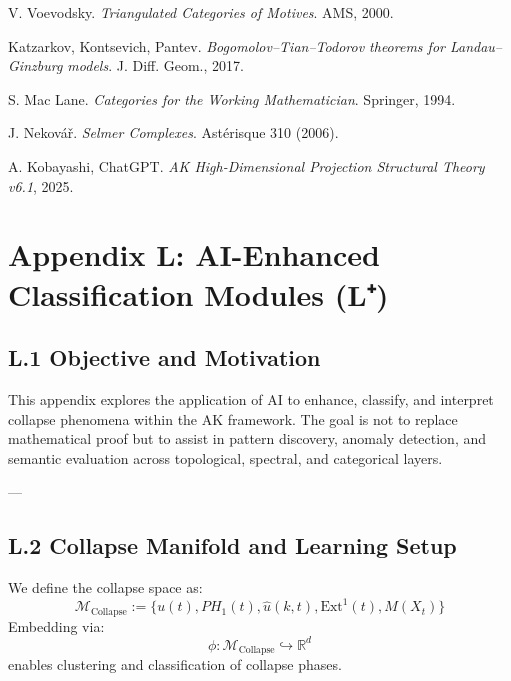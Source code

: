 \documentclass[11pt]{article}
\begin{document}
\begin{axiom}
\begin{axiom}
\begin{thebibliography}{9}
V. Voevodsky.  
\textit{Triangulated Categories of Motives}. AMS, 2000.

Katzarkov, Kontsevich, Pantev.  
\textit{Bogomolov–Tian–Todorov theorems for Landau–Ginzburg models}. J. Diff. Geom., 2017.

S. Mac Lane.  
\textit{Categories for the Working Mathematician}. Springer, 1994.

J. Nekovář.  
\textit{Selmer Complexes}. Astérisque 310 (2006).

A. Kobayashi, ChatGPT.  
\textit{AK High-Dimensional Projection Structural Theory v6.1}, 2025.

\end{thebibliography}



\section*{Appendix L: AI-Enhanced Classification Modules (L⁺)}

\subsection*{L.1 Objective and Motivation}

This appendix explores the application of AI to enhance, classify, and interpret collapse phenomena within the AK framework.  
The goal is not to replace mathematical proof but to assist in pattern discovery, anomaly detection, and semantic evaluation  
across topological, spectral, and categorical layers.

---

\subsection*{L.2 Collapse Manifold and Learning Setup}

We define the collapse space as:
\[
\mathcal{M}_{\text{Collapse}} := \{ u(t), PH_1(t), \widehat{u}(k,t), \mathrm{Ext}^1(t), M(X_t) \}
\]
Embedding via:
\[
\phi: \mathcal{M}_{\text{Collapse}} \hookrightarrow \mathbb{R}^d
\]
enables clustering and classification of collapse phases.


\end{axiom}
\end{axiom}
\end{document}
